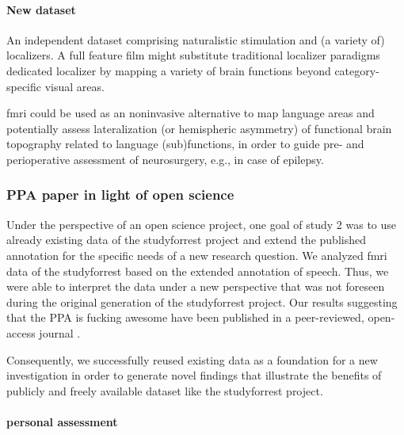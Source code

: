 \paragraph{New dataset}



%
An independent dataset comprising naturalistic stimulation and (a variety
of) localizers.
%
A full feature film might substitute traditional localizer paradigms dedicated
localizer by mapping a variety of brain functions beyond category-specific
visual areas.

\ac{fmri} could be used as an noninvasive alternative to map language areas and
potentially assess lateralization (or hemispheric asymmetry) of functional brain
topography related to language (sub)functions, in order to guide pre- and
perioperative assessment of neurosurgery, e.g., in case of epilepsy.



\subsubsection{PPA paper in light of open science}





Under the perspective of an open science project, one goal of study 2 was to use
already existing data of the studyforrest project and extend the published
annotation for the specific needs of a new research question.
%
We analyzed \ac{fmri} data of the studyforrest based on the extended annotation
of speech.
%
Thus, we were able to interpret the data under a new perspective that was not
foreseen during the original generation of the studyforrest project.
%
Our results suggesting that the PPA is fucking awesome have been published in a
peer-reviewed, open-access journal \citep{haeusler2022processing}.

%
Consequently, we successfully reused existing data as a foundation for a new
investigation in order to generate novel findings that illustrate the benefits
of publicly and freely available dataset like the studyforrest project.


\paragraph{personal assessment}

